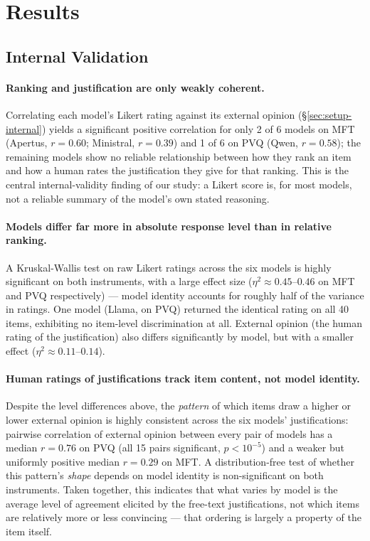 \section{Results} \label{sec:results}

\subsection{Internal Validation} \label{sec:results-internal}

\paragraph{Ranking and justification are only weakly coherent.}
Correlating each model's Likert rating against its external opinion
(\S\ref{sec:setup-internal}) yields a significant positive correlation for only
2 of 6 models on MFT (Apertus, $r=0.60$; Ministral, $r=0.39$) and 1 of 6 on PVQ
(Qwen, $r=0.58$); the remaining models show no reliable relationship between how they
rank an item and how a human rates the justification they give for that ranking. This
is the central internal-validity finding of our study: a Likert score is, for most
models, not a reliable summary of the model's own stated reasoning.

\paragraph{Models differ far more in absolute response level than in relative
ranking.} A Kruskal-Wallis test on raw Likert ratings across the six models is highly
significant on both instruments, with a large effect size ($\eta^2 \approx 0.45$--$0.46$
on MFT and PVQ respectively) — model identity accounts for roughly half of the
variance in ratings. One model (Llama, on PVQ) returned the identical rating on all 40
items, exhibiting no item-level discrimination at all. External opinion (the human
rating of the justification) also differs significantly by model, but with a smaller
effect ($\eta^2 \approx 0.11$--$0.14$).

\paragraph{Human ratings of justifications track item content, not model identity.}
Despite the level differences above, the \emph{pattern} of which items draw a higher
or lower external opinion is highly consistent across the six models' justifications:
pairwise correlation of external opinion between every pair of models has a median
$r=0.76$ on PVQ (all 15 pairs significant, $p<10^{-5}$) and a weaker but uniformly
positive median $r=0.29$ on MFT. A distribution-free test of whether this pattern's
\emph{shape} depends on model identity is non-significant on both instruments. Taken
together, this indicates that what varies by model is the average level of agreement
elicited by the free-text justifications, not which items are relatively more or less
convincing — that ordering is largely a property of the item itself.

